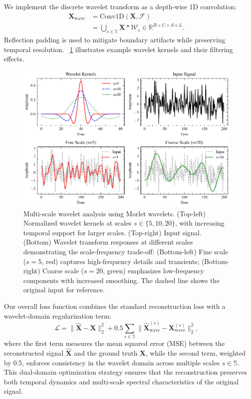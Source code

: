 \documentclass[conference]{IEEEtran}
\begin{document}
We implement the discrete wavelet transform as a depth-wise 1D convolution:
\begin{equation}
    \begin{aligned}
        \mathbf{X}_{\text{wave}} & = \text{Conv1D}(\mathbf{X}, \mathcal{F})                                                            \\
                                 & = \bigcup_{s\in\mathbb{S}} \mathbf{X}\ast \mathcal{W}_s \in \mathbb{R}^{B\times C\times S\times L}.
    \end{aligned}
\end{equation}
Reflection padding is used to mitigate boundary artifacts while preserving temporal resolution. \figurename~\ref{fig:wavelet-transform} illustrates example wavelet kernels and their filtering effects.

\begin{figure}[tbp]
    \centering
    \includegraphics[width=\linewidth]{wavelet-transform.pdf}
    \caption{Multi-scale wavelet analysis using Morlet wavelets. (Top-left) Normalized wavelet kernels at scales $s \in \{5, 10, 20\}$, with increasing temporal support for larger scales. (Top-right) Input signal. (Bottom) Wavelet transform responses at different scales demonstrating the scale-frequency trade-off: (Bottom-left) Fine scale ($s=5$, red) captures high-frequency details and transients; (Bottom-right) Coarse scale ($s=20$, green) emphasizes low-frequency components with increased smoothing. The dashed line shows the original input for reference.}
    \label{fig:wavelet-transform}
\end{figure}

Our overall loss function combines the standard reconstruction loss with a wavelet-domain regularization term:
\begin{equation}
    \mathcal{L} = \|\mathbf{\hat{X}} - \mathbf{X}\|_2^2 + 0.5\sum_{s\in\mathbb{S}} \|\mathbf{\hat{X}}_{\text{wave}}^{(s)} - \mathbf{X}_{\text{wave}}^{(s)}\|_2^2,
\end{equation}
where the first term measures the mean squared error (MSE) between the reconstructed signal $\mathbf{\hat{X}}$ and the ground truth $\mathbf{X}$, while the second term, weighted by 0.5, enforces consistency in the wavelet domain across multiple scales $s \in \mathbb{S}$. This dual-domain optimization strategy ensures that the reconstruction preserves both temporal dynamics and multi-scale spectral characteristics of the original signal.
\end{document}
